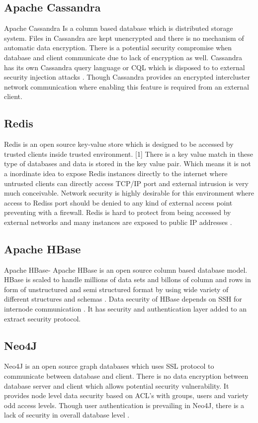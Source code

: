\documentclass[sigconf]{acmart}
\begin{document}
\subsection{Apache Cassandra}
Apache Cassandra Is a column based database which is distributed storage system. Files in Cassandra are kept unencrypted and there is no mechanism of automatic data encryption. There is a potential security compromise when database and client communicate due to lack of encryption as well.  Cassandra has its own Cassandra query language or CQL which is disposed to to external security injection attacks \cite{editor05}.  Though Cassandra provides an encrypted intercluster network communication where enabling this feature is required from an external client. 

\subsection{Redis}
Redis is an open source key-value store which is designed to be accessed by trusted clients inside trusted environment. [1] There is a key value match in these type of databases and data is stored in the key value pair. Which means it is not a inordinate idea to expose Redis instances directly to the internet where untrusted clients can directly access TCP/IP port and external intrusion is very much conceivable. Network security is highly desirable for this environment where access to Rediss port should be denied to any kind of external access point preventing with a firewall. Redis is hard to protect from being accessed by external networks and many instances are exposed to public IP addresses \cite{editor03}. 

\subsection{Apache HBase}
Apache HBase- Apache HBase is an open source column based database model. HBase is scaled to handle millions of data sets and billons of column and rows in form of unstructured and semi structured format by using wide variety of different structures and schemas \cite{editor07}. Data security of HBase depends on SSH for internode communication \cite{editor07}.  It has security and authentication layer added to an extract security protocol. 

\subsection{Neo4J}
Neo4J is an open source graph databases which uses SSL protocol to communicate between database and client. There is no data encryption between database server and client which allows potential security vulnerability. It provides node level data security based on ACL’s with groups, users and variety odd access levels. Though user authentication is prevailing in Neo4J, there is a lack of security in overall database level \cite{editor03}.
\end{document}

